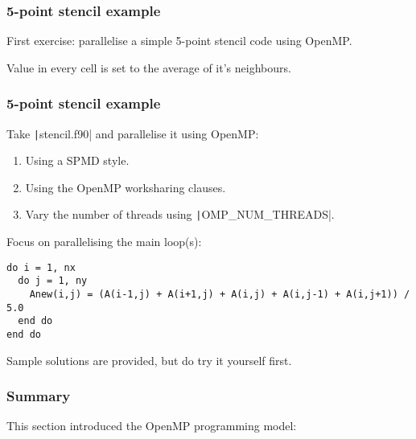 \documentclass{beamer}
\begin{document}
\begin{frame}
\frametitle{5-point stencil example}
First exercise: parallelise a simple 5-point stencil code using OpenMP.

\begin{center}
\end{center}

Value in every cell is set to the average of it's neighbours.
\end{frame}

\begin{frame}[fragile]
\frametitle{5-point stencil example}
Take \texttt|stencil.f90| and parallelise it using OpenMP:
\begin{enumerate}
  \item Using a SPMD style.
  \item Using the OpenMP worksharing clauses.
  \item Vary the number of threads using \texttt|OMP_NUM_THREADS|.
\end{enumerate}

Focus on parallelising the main loop(s):
\begin{verbatim}
do i = 1, nx
  do j = 1, ny
    Anew(i,j) = (A(i-1,j) + A(i+1,j) + A(i,j) + A(i,j-1) + A(i,j+1)) / 5.0
  end do
end do
\end{verbatim}

Sample solutions are provided, but do try it yourself first.

\end{frame}

\begin{frame}
\frametitle{Summary}
This section introduced the OpenMP programming model:
\end{frame}
\end{document}
